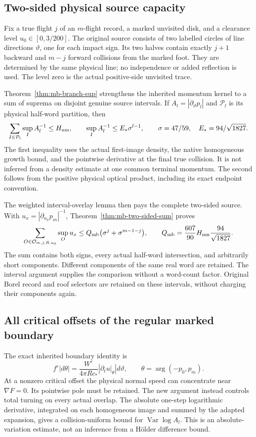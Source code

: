 \subsection*{Two-sided physical source capacity}
Fix a true flight $j$ of an $m$-flight record, a marked unvisited disk,
and a clearance level $u_0\in[0,3/200]$. The original source consists
of two labelled circles of line directions $\vartheta$, one for each
impact sign. Its two halves contain exactly $j+1$ backward and
$m-j$ forward collisions from the marked foot. They are determined
by the same physical line; no independence or added reflection is used.
The level zero is the actual positive-side unvisited trace.

Theorem~\ref{thm:mb-branch-sup} strengthens the inherited momentum
kernel to a sum of suprema on disjoint genuine source intervals. If
$A_l=|\partial_\vartheta p_l|$ and $\mathcal P_l$ is its physical
half-word partition, then
\[
 \sum_{I\in\mathcal P_l}\sup_I A_l^{-1}\le H_{\rm nm},\qquad
 \sup_I A_l^{-1}\le E_*\sigma^{l-1},\qquad
 \sigma=47/59,\quad E_*=94/\sqrt{1827}.
\]
The first inequality uses the actual first-image density, the native
homogeneous growth bound, and the pointwise derivative at the final
true collision. It is not inferred from a density estimate at one
common terminal momentum. The second follows from the positive
physical optical product, including its exact endpoint convention.

The weighted interval-overlay lemma then pays the complete two-sided
source. With $u_x=|\partial_{\alpha_0}p_m|^{-1}$,
Theorem~\ref{thm:mb-two-sided-sum} proves
\begin{equation}\label{eq:intro-marked-capacity}
 \sum_{O\in\mathcal O_{m,j,R,u_0}}\sup_O u_x
 \le Q_{\rm mb}\bigl(\sigma^j+\sigma^{m-1-j}\bigr),\qquad
 Q_{\rm mb}=\frac{607}{90}H_{\rm nm}\frac{94}{\sqrt{1827}}.
\end{equation}
The sum contains both signs, every actual half-word intersection,
and arbitrarily short components. Different components of the same
real word are retained. The interval argument supplies the comparison
without a word-count factor. Original Borel record and roof selectors
are retained on these intervals, without charging their components again.

\subsection*{All critical offsets of the regular marked boundary}
The exact inherited boundary identity is
\[
 f^\varepsilon|d\theta|
 =\frac{W^\varepsilon}{4\pi Rc_*}
          \left|\partial_tu\big|_\theta\right|d\vartheta,
 \qquad \theta=\arg(-p_0,p_m).
\]
At a nonzero critical offset the physical normal speed can concentrate
near $\nabla F=0$. Its pointwise pole must be retained. The new
argument instead controls total turning on every actual overlap.
The absolute one-step logarithmic derivative, integrated on each
homogeneous image and summed by the adapted expansion, gives a
collision-uniform bound for $\operatorname{Var}\log A_l$.
This is an absolute-variation estimate, not an inference from a
H\"older difference bound.

